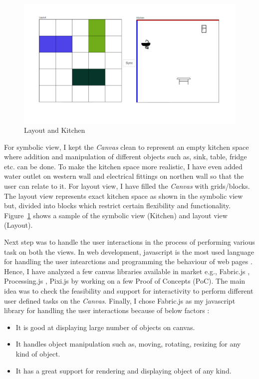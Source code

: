 \begin{figure}
	\includegraphics[width=1\textwidth]{figures/Layout_Kitchen}
	\caption{Layout and Kitchen}
	\label{fig:Layout_Kitchen}
\end{figure}

For symbolic view, I kept the \textit{Canvas} clean to represent an empty kitchen space where addition and manipulation of different objects such as, sink, table, fridge etc. can be done. To make the kitchen space more realistic, I have even added {\color{blue} water outlet} on western wall and {\color{red} electrical fittings} on northen wall so that the user can relate to it. For layout view, I have filled the \textit{Canvas} with grids/blocks. The layout view represents exact kitchen space as shown in the symbolic view but, divided into blocks which restrict certain flexibility and functionality. Figure~\ref{fig:Layout_Kitchen} shows a sample of the symbolic view (Kitchen) and layout view (Layout).

Next step was to handle the user interactions in the process of performing various task on both the views. In web development, javascript is the most used language for handling the user intearctions and programming the behaviour of web pages \cite{javascript}. Hence, I have analyzed a few canvas libraries available in market e.g., Fabric.js \cite{fabricjs}, Processing.js \cite{processingjs}, Pixi.js \cite{pixijs}  by working on a few Proof of Concepts (PoC). The main idea was to check the feasibility and support for interactivity to perform different user defined tasks on the \textit{Canvas}. Finally, I chose Fabric.js as my javascript library for handling the user interactions because of below factors \cite{fabricjs}:
\begin{itemize}
	\item {It is good at displaying large number of objects on canvas.}
	\item {It handles object manipulation such as, moving, rotating, resizing for any kind of object.}
	\item {It has a great support for rendering and displaying object of any kind.}
\end{itemize}

